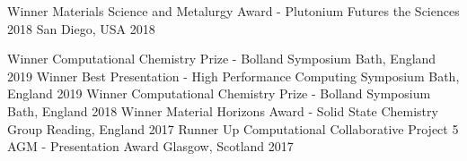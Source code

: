 \begin{cvhonors}
  \cvhonor
    {Winner}
    {Materials Science and Metalurgy Award - Plutonium Futures the Sciences 2018}
    {San Diego, USA}
    {2018}
\end{cvhonors}

\begin{cvhonors}
  \cvhonor
    {Winner}
    {Computational Chemistry Prize - Bolland Symposium}
    {Bath, England}
    {2019}
  \cvhonor
    {Winner}
    {Best Presentation - High Performance Computing Symposium}
    {Bath, England}
    {2019}
  \cvhonor
    {Winner}
    {Computational Chemistry Prize - Bolland Symposium}
    {Bath, England}
    {2018}
   \cvhonor
    {Winner}
    {Material Horizons Award - Solid State Chemistry Group}
    {Reading, England}
    {2017}
   \cvhonor
    {Runner Up}
    {Computational Collaborative Project 5 AGM - Presentation Award}
    {Glasgow, Scotland}
    {2017}


\end{cvhonors}
